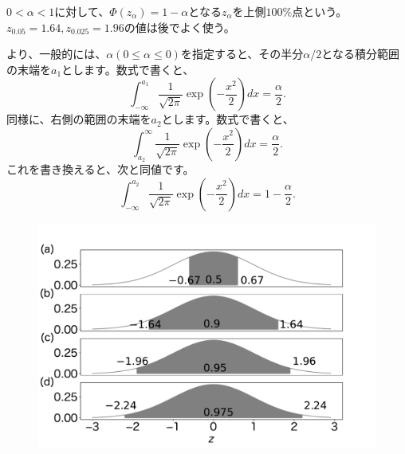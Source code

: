 $0<\alpha<1$に対して、$\Phi(z_\alpha) = 1-\alpha$となる$z_\alpha$を上側$100\%$点という。
$z_{0.05}=1.64,z_{0.025}=1.96$の値は後でよく使う。

より、一般的には、$\alpha(0\leq \alpha \leq 0)$を指定すると、その半分$\alpha/2$となる積分範囲の末端を$a_1$とします。数式で書くと、
\begin{equation}
    \int_{-\infty}^{a_1} \frac{1}{\sqrt{2\pi}}\exp(-\frac{x^2}{2})dx = \frac{\alpha}{2}.
\end{equation}
同様に、右側の範囲の末端を$a_2$とします。数式で書くと、
\begin{equation*}
    \int_{a_2}^{\infty} \frac{1}{\sqrt{2\pi}}\exp(-\frac{x^2}{2})dx = \frac{\alpha}{2}.
\end{equation*}
これを書き換えると、次と同値です。
\begin{equation*}
    \int_{-\infty}^{a_2} \frac{1}{\sqrt{2\pi}}\exp(-\frac{x^2}{2})dx = 1-\frac{\alpha}{2}.
\end{equation*}

\begin{figure}
\begin{center}
    \includegraphics[width=15cm]{./image/02_/z_value.pdf}
  \end{center}
\end{figure}


